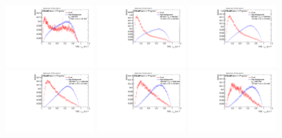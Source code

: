 \begin{figure}[H]
\includegraphics[width=0.3\textwidth]{sascha_input/Appendix/Distributions/top/distributions/beta17/h_assisted_tj_nSub32_17_bin1.pdf} \hspace{1mm}
\includegraphics[width=0.3\textwidth]{sascha_input/Appendix/Distributions/top/distributions/beta17/h_assisted_tj_nSub32_17_bin2.pdf} \hspace{1mm}
\includegraphics[width=0.3\textwidth]{sascha_input/Appendix/Distributions/top/distributions/beta17/h_assisted_tj_nSub32_17_bin3.pdf} 
\bigskip
\includegraphics[width=0.3\textwidth]{sascha_input/Appendix/Distributions/top/distributions/beta17/h_assisted_tj_nSub32_17_bin4.pdf} \hspace{1mm}
\includegraphics[width=0.3\textwidth]{sascha_input/Appendix/Distributions/top/distributions/beta17/h_assisted_tj_nSub32_17_bin5.pdf} \hspace{1mm}
\includegraphics[width=0.3\textwidth]{sascha_input/Appendix/Distributions/top/distributions/beta17/h_assisted_tj_nSub32_17_bin6.pdf} 

\end{figure}
